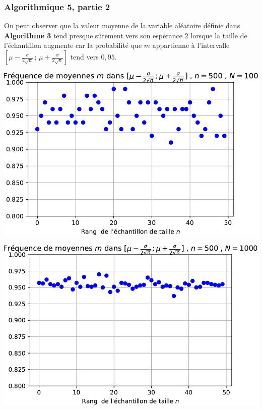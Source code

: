 \documentclass[11pt, hyperref={urlcolor=red,%
            linkcolor=blue, %
            colorlinks=true}]{beamer}
\newcommand{\Interff}[2]{\left[#1\, ;\, #2\right]}
\begin{document}
\begin{frame}[fragile]
\frametitle{Algorithmique 5,  partie 2}


On peut observer que la valeur moyenne de la variable aléatoire définie dans \textbf{Algorithme 3} tend presque sûrement vers son espérance  $2$ lorsque la taille de l'échantillon augmente  car la probabilité que $m$ appartienne à l'intervalle $\Interff{\mu - \frac{\sigma}{2 \sqrt{n}}}{\mu + \frac{\sigma}{2 \sqrt{n}}}$ tend vers $0,95$.


\begin{minipage}{0.45\linewidth}
\begin{center}

\includegraphics[scale=0.3]{images/frequence-fluctuation-N-100-crop.pdf}
\end{center}
\end{minipage}
\hfill 
\begin{minipage}{0.45\linewidth}
\begin{center}

\includegraphics[scale=0.3]{images/frequence-fluctuation-N-1000-crop.pdf}
\end{center}
\end{minipage}



\end{frame}
\end{document}
